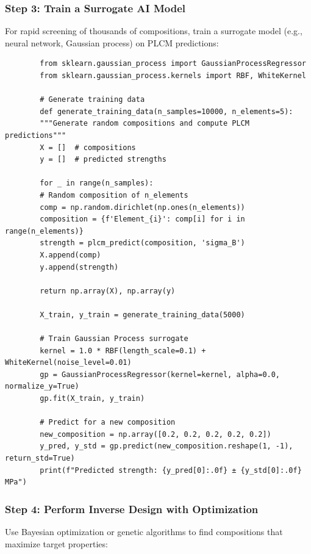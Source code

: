 \documentclass[12pt,a4paper]{article}
\begin{document}
	\subsubsection{Step 3: Train a Surrogate AI Model}
	
	For rapid screening of thousands of compositions, train a surrogate model (e.g., neural network, Gaussian process) on PLCM predictions:
	
	\begin{verbatim}
		from sklearn.gaussian_process import GaussianProcessRegressor
		from sklearn.gaussian_process.kernels import RBF, WhiteKernel
		
		# Generate training data
		def generate_training_data(n_samples=10000, n_elements=5):
		"""Generate random compositions and compute PLCM predictions"""
		X = []  # compositions
		y = []  # predicted strengths
		
		for _ in range(n_samples):
		# Random composition of n_elements
		comp = np.random.dirichlet(np.ones(n_elements))
		composition = {f'Element_{i}': comp[i] for i in range(n_elements)}
		strength = plcm_predict(composition, 'sigma_B')
		X.append(comp)
		y.append(strength)
		
		return np.array(X), np.array(y)
		
		X_train, y_train = generate_training_data(5000)
		
		# Train Gaussian Process surrogate
		kernel = 1.0 * RBF(length_scale=0.1) + WhiteKernel(noise_level=0.01)
		gp = GaussianProcessRegressor(kernel=kernel, alpha=0.0, normalize_y=True)
		gp.fit(X_train, y_train)
		
		# Predict for a new composition
		new_composition = np.array([0.2, 0.2, 0.2, 0.2, 0.2])
		y_pred, y_std = gp.predict(new_composition.reshape(1, -1), return_std=True)
		print(f"Predicted strength: {y_pred[0]:.0f} ± {y_std[0]:.0f} MPa")
	\end{verbatim}
	
	\subsubsection{Step 4: Perform Inverse Design with Optimization}
	
	Use Bayesian optimization or genetic algorithms to find compositions that maximize target properties:
	
\end{document}
